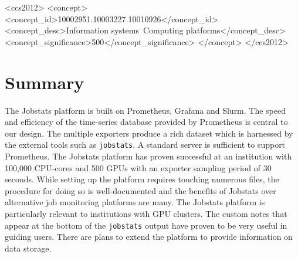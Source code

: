 \documentclass[manuscript]{acmart}
\begin{document}
\begin{CCSXML}
<ccs2012>
   <concept>
       <concept_id>10002951.10003227.10010926</concept_id>
       <concept_desc>Information systems~Computing platforms</concept_desc>
       <concept_significance>500</concept_significance>
       </concept>
 </ccs2012>
\end{CCSXML}







\maketitle





\section{Summary}
The Jobstats platform is built on Prometheus, Grafana and Slurm. The speed and efficiency of the time-series database provided by Prometheus is central to our design. The multiple exporters produce a rich dataset which is harnessed by the external tools such as \texttt{jobstats}. A standard server is sufficient to support Prometheus. The Jobstats platform has proven successful at an institution with 100,000 CPU-cores and 500 GPUs with an exporter sampling period of 30 seconds. While setting up the platform requires touching numerous files, the procedure for doing so is well-documented and the benefits of Jobstats over alternative job monitoring platforms are many. The Jobstats platform is particularly relevant to institutions with GPU clusters. The custom notes that appear at the bottom of the \texttt{jobstats} output have proven to be very useful in guiding users. There are plans to extend the platform to provide information on data storage.
\end{document}
